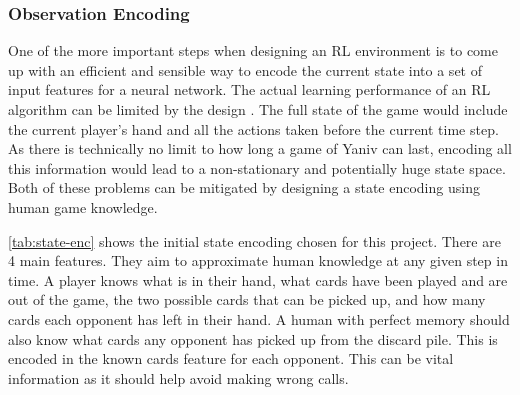 \documentclass[../main.tex]{subfiles}
\begin{document}
\subsubsection{Observation Encoding}
One of the more important steps when designing an RL environment is to come up with an efficient and sensible way to encode the current state into a set of input features for a neural network. The actual learning performance of an RL algorithm can be limited by the design \cite{sutton_reinforcement_2018}. The full state of the game would include the current player's hand and all the actions taken before the current time step. As there is technically no limit to how long a game of Yaniv can last, encoding all this information would lead to a non-stationary and potentially huge state space. Both of these problems can be mitigated by designing a state encoding using human game knowledge. 

\autoref{tab:state-enc} shows the initial state encoding chosen for this project. There are 4 main features. They aim to approximate human knowledge at any given step in time. A player knows what is in their hand, what cards have been played and are out of the game, the two possible cards that can be picked up, and how many cards each opponent has left in their hand. A human with perfect memory should also know what cards any opponent has picked up from the discard pile. This is encoded in the known cards feature for each opponent. This can be vital information as it should help avoid making wrong calls. 

\begin{table}[]
\caption{The Yaniv State Encoding.}
\label{tab:state-enc}
\end{table}
\end{document}
